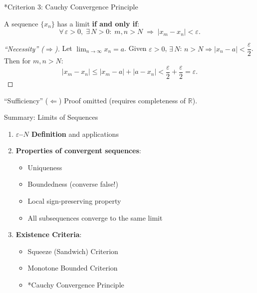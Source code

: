 \documentclass[aspectratio=169,10pt]{beamer}
\begin{document}
\begin{frame}{*Criterion 3: Cauchy Convergence Principle}
  \begin{theorem}\label{thm:cauchy}
    A sequence $\{x_n\}$ has a limit \textbf{if and only if}:
    \[
      \forall\,\varepsilon>0,\;\exists\,N>0:\;
      m,n > N \;\Longrightarrow\; |x_m - x_n| < \varepsilon.
    \]
  \end{theorem}
  \pause
  \begin{proof}[``Necessity'' ($\Rightarrow$)]
    Let $\displaystyle\lim_{n\to\infty}x_n = a$.
    \pause
    Given $\varepsilon>0$, $\exists\,N$: $n>N \Rightarrow |x_n-a|<\dfrac{\varepsilon}{2}$.
    \pause
    Then for $m,n > N$:
    \[
      |x_m-x_n| \leq |x_m-a|+|a-x_n| < \frac{\varepsilon}{2}+\frac{\varepsilon}{2}=\varepsilon.
    \]
  \end{proof}
  \pause
  \begin{block}{``Sufficiency'' ($\Leftarrow$)}
    Proof omitted (requires completeness of $\mathbb{R}$).
  \end{block}
\end{frame}

\begin{frame}{Summary: Limits of Sequences}
  \begin{enumerate}
    \item \textbf{$\varepsilon$--$N$ Definition} and applications
    \item \textbf{Properties of convergent sequences}:
    \begin{itemize}
      \item Uniqueness
      \item Boundedness (converse false!)
      \item Local sign-preserving property
      \item All subsequences converge to the same limit
    \end{itemize}
    \item \textbf{Existence Criteria}:
    \begin{itemize}
      \item Squeeze (Sandwich) Criterion
      \item Monotone Bounded Criterion
      \item *Cauchy Convergence Principle
    \end{itemize}
  \end{enumerate}
\end{frame}
\end{document}
